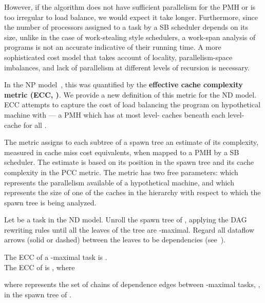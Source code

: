 However, if the algorithm does not have sufficient parallelism for the
PMH or is too irregular to load balance, we would expect it take
longer. Furthermore, since the number of processors assigned to a task
by a SB scheduler depends on its size, unlike in the case of
work-stealing style schedulers, a work-span analysis of programs is
not an accurate indicative of their running time.  A more
sophisticated cost model that takes account of locality,
parallelism-space imbalances, and lack of parallelism at different
levels of recursion is necessary.

In the NP model~\cite[Defn. 3]{BlellochFiGi11}, this was quantified by
the {\bf effective cache complexity metric (ECC, )}. We provide
a new definition of this metric for the ND model.  ECC attempts to
capture the cost of load balancing the program on hypothetical machine
with   --- a PMH which
has at most  level- caches
beneath each level- cache for all .

The metric assigns to each subtree of a spawn tree an estimate of its
complexity, measured in cache miss cost equivalents, when mapped to a
PMH by a SB scheduler. The estimate is based on its position in the
spawn tree and its cache complexity in the PCC metric. The metric has
two free parameters:  which represents the parallelism
available of a hypothetical machine, and  which represents the size
of one of the caches in the hierarchy with respect to which the spawn
tree is being analyzed.

\begin{definition}
\label{def:qhat-fire}

Let  be a task in the ND model.  Unroll the spawn tree of ,
applying the DAG rewriting rules until all the leaves of the tree are
-maximal. Regard all dataflow arrows (solid or dashed) between the
leaves to be dependencies (see~).

\noindent The ECC of a -maximal task  is
 .\\

\noindent The ECC of  is  , where
  


where  represents the set of chains of dependence edges
between -maximal tasks, , in the spawn tree of .
\end{definition}

